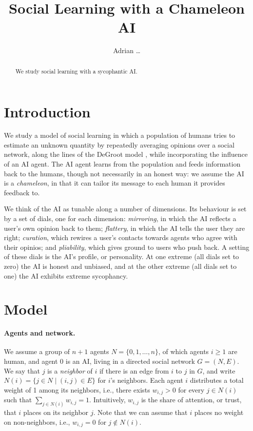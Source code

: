 \documentclass{scrartcl}
\title{
    Social Learning with a Chameleon AI
    }
\author{Adrian \dots}
\date{}
\theoremstyle{definition}
\begin{document}
\maketitle

\begin{abstract}
    \noindent
    We study social learning with a sycophantic AI.
\end{abstract}

\section{Introduction}\label{sec:introduction}
We study a model of social learning in which a population of humans 
tries to estimate an unknown quantity by repeatedly averaging opinions 
over a social network, along the lines of the DeGroot model 
\citep{DeGroot1974ReachingConsensus,Golub2010NaiveLearning},
while incorporating the influence of an AI agent. 
The AI agent learns from the population and 
feeds information back   to the humans, though not necessarily in an honest way: 
we assume the AI is a \emph{chameleon}, in that it can tailor its 
message to each human it provides feedback to.

We think of the AI as tunable along a number of dimensions. 
Its behaviour is set by a set of dials, one for each dimension: 
\emph{mirroring}, in which the AI reflects a user's own opinion back to them; 
\emph{flattery}, in which the AI tells the user they are right; 
\emph{curation}, which rewires a user's contacts towards agents who agree with their opinios; 
and \emph{pliability}, which gives ground to users who push back. 
A setting of these dials is the AI's profile, or personality. 
At one extreme (all dials set to zero) the AI is honest and unbiased,
and at the other extreme (all dials set to one) the AI exhibits extreme sycophancy.



\section{Model}\label{sec:model}

\paragraph{Agents and network.}
We assume a group of $n+1$ agents $N = \{0, 1, \dots, n\}$,
of which agents $i \geq 1$ are human, and agent 0 is an AI,
living in a directed social network $G = (N, E)$.
We say that $j$ is a \emph{neighbor} of $i$ 
if there is an edge from $i$ to $j$ in $G$,  
and write $N(i) = \{j \in N \mid (i, j) \in E\}$
for $i$'s neighbors. 
Each agent $i$ distributes a total weight of 1 
among its neighbors, i.e., there exists $w_{i,j} > 0$ 
for every $j \in N(i)$ such that $\sum_{j \in N(i)} w_{i, j} = 1$.
Intuitively, $w_{i, j}$ is the share of attention, or trust, 
that $i$ places on its neighbor $j$.   
Note that we can assume that $i$ places no weight on non-neighbors,
i.e., $w_{i, j} = 0$ for $j \notin N(i)$. 
\end{document}
